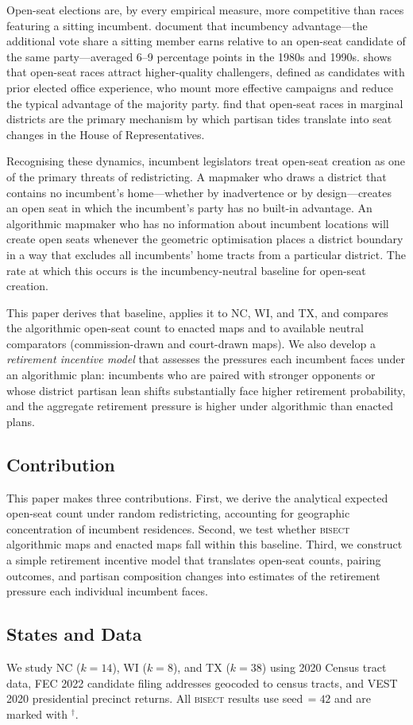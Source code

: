 \label{sec:introduction}

Open-seat elections are, by every empirical measure, more competitive than races
featuring a sitting incumbent. \citet{cox1996legislative} document that incumbency
advantage---the additional vote share a sitting member earns relative to an open-seat
candidate of the same party---averaged 6--9 percentage points in the 1980s and 1990s.
\citet{jacobson2006politics} shows that open-seat races attract higher-quality
challengers, defined as candidates with prior elected office experience, who mount
more effective campaigns and reduce the typical advantage of the majority party.
\citet{cain1987incumbency} find that open-seat races in marginal districts are the
primary mechanism by which partisan tides translate into seat changes in the House
of Representatives.

Recognising these dynamics, incumbent legislators treat open-seat creation as one of
the primary threats of redistricting. A mapmaker who draws a district that contains
no incumbent's home---whether by inadvertence or by design---creates an open seat in
which the incumbent's party has no built-in advantage. An algorithmic mapmaker who
has no information about incumbent locations will create open seats whenever the
geometric optimisation places a district boundary in a way that excludes all incumbents'
home tracts from a particular district. The rate at which this occurs is the
incumbency-neutral baseline for open-seat creation.

This paper derives that baseline, applies it to NC, WI, and TX, and compares the
algorithmic open-seat count to enacted maps and to available neutral comparators
(commission-drawn and court-drawn maps). We also develop a \textit{retirement incentive
model} that assesses the pressures each incumbent faces under an algorithmic plan:
incumbents who are paired with stronger opponents or whose district partisan lean
shifts substantially face higher retirement probability, and the aggregate retirement
pressure is higher under algorithmic than enacted plans.

\subsection{Contribution}

This paper makes three contributions. First, we derive the analytical expected
open-seat count under random redistricting, accounting for geographic concentration
of incumbent residences. Second, we test whether \textsc{bisect} algorithmic maps
and enacted maps fall within this baseline. Third, we construct a simple retirement
incentive model that translates open-seat counts, pairing outcomes, and partisan
composition changes into estimates of the retirement pressure each individual incumbent
faces.

\subsection{States and Data}

We study NC ($k=14$), WI ($k=8$), and TX ($k=38$) using 2020 Census tract data,
FEC 2022 candidate filing addresses geocoded to census tracts, and VEST 2020
presidential precinct returns. All \textsc{bisect} results use seed\,$=42$ and
are marked with $^\dagger$.
